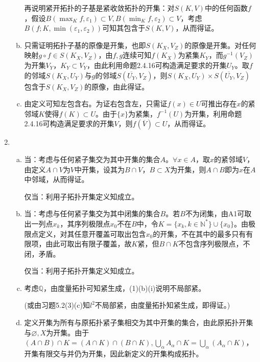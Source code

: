 \documentclass[a4paper,UTF8,fontset=windows]{ctexart}
\begin{document}
\begin{enumerate}[(1)]
\begin{enumerate}[(a)]
    再说明紧开拓扑的子基是紧收敛拓扑的开集：对$S(K,V)$中的任何函数$f$，假设$B(\max_Kf,\varepsilon_1)\subset V,B(\min_Kf,\varepsilon_2)\subset V$，考虑$B(f;K,\min(\varepsilon_1,\varepsilon_2))$可知其包含于$S(K,V)$，从而得证。
    
    \item
    只需证明拓扑子基的原像是开集，也即$S(K_X,V_Z)$的原像是开集。对任何映射$g\circ f\in S(K_X,V_Z)$，由$f,g$连续可知$f(K_X)$为紧集$K_Y$，而$g^{-1}(V_Z)$为开集$V_Y$，$K_Y\subset V_Y$，由此利用命题2.4.16可构造满足要求的开集$U_Y$。取$f$的邻域$S(K_X,U_Y)$与$g$的邻域$S(\overline{U_Y},V_Z)$，则$S(K_X,U_Y)\times S(\overline{U_Y},V_Z)$包含于$S(K_X,V_Z)$的原像，由此得证。
    
    \item
    由定义可知左包含右。为证右包含左，只需证$f(x)\in U$可推出存在$x$的紧邻域$K$使得$f(K)\subset U$。由于$\{x\}$为紧集，$f^{-1}(U)$为开集，利用命题2.4.16可构造满足要求的开集$V$，则$f(\overline{V})\subset U$，从而得证。
    \end{enumerate}
    
    \item
    \begin{enumerate}[(a)]
    \item
    当：考虑与任何紧子集交为其中开集的集合$A$。$\forall x\in A$，取$x$的紧邻域$V$，由定义$A\cap V$为$V$中开集，设其为$B\cap V$，$B\subset X$为开集，则$A\cap B$即为$x$在$A$中邻域，从而得证。
    
    仅当：利用子拓扑开集定义知成立。
    
    \item
    当：考虑与任何紧子集交为其中闭集的集合$B$。若$B$不为闭集，由A1可取出一列点$x_k$，其序列极限点$x_0$不在$B$中，令$K=\{x_k,k\in\mathbb{N}^*\}\cup\{x_0\}$。由极限点定义，对其任意开覆盖可取出包含$x_0$的开集，不在其中的最多只有有限项，由此可取出有限子覆盖，故$K$紧，但$B\cap K$不包含序列极限点，不闭，矛盾。
    
    仅当：利用子拓扑开集定义知成立。
    
    \item
    考虑$\mathbb{Q}$，由度量拓扑可知紧生成，(1)(b)(i)说明不局部紧。
    
    (或由习题5.2(3)(c)知$l^2$不局部紧，由度量拓扑知紧生成，即得证。)
    
    \item
    定义开集为所有与原拓扑紧子集相交为其中开集的集合，由此原拓扑开集与$\varnothing,X$为开集。由于$(A\cap B)\cap K=(A\cap K)\cap(B\cap K),\bigcup_\alpha A_\alpha\cap K=\bigcup_\alpha(A_\alpha\cap K)$，开集有限交与并仍为开集，因此新定义的开集构成拓扑。
    

\end{enumerate}
\end{enumerate}
\end{document}
